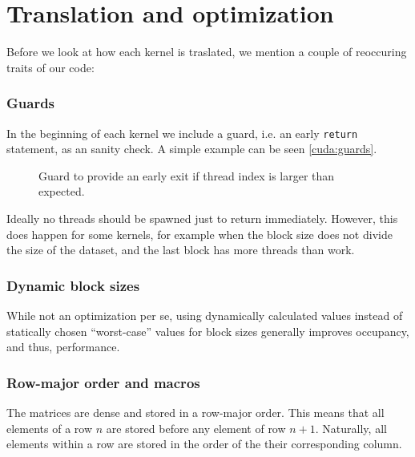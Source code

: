 
\section{Translation and optimization}

Before we look at how each kernel is traslated, we mention a couple of
reoccuring traits of our code:

\subsubsection{Guards} In the beginning of each kernel we include a guard, i.e.
an early \texttt{return} statement, as an sanity check. A simple example can be
seen \autoref{cuda:guards}.

\begin{figure}[H]
    \centering
    \caption{Guard to provide an early exit if thread index is larger than expected.}
    \label{cuda:guards}
\end{figure}

Ideally no threads should be spawned just to return immediately. However, this
does happen for some kernels, for example when the block size does not divide
the size of the dataset, and the last block has more threads than work.

\subsubsection{Dynamic block sizes}
While not an optimization per se, using dynamically calculated values instead
of statically chosen \enquote{worst-case} values for block sizes generally
improves occupancy, and thus, performance.


\subsubsection{Row-major order and macros}
The matrices are dense and stored in a row-major order.
This means that all elements of a row \(n\) are stored before any element of
row \(n+1\).
Naturally, all elements within a row are stored in the order of the their
corresponding column.


